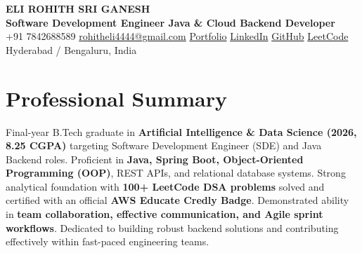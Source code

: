 \documentclass[a4paper,10pt]{article}
\begin{document}
\begin{center}
    {\LARGE\bfseries ELI ROHITH SRI GANESH}\\[2pt]
    {\textbf{\large Software Development Engineer \;\textbar\; Java \& Cloud Backend Developer}}\\[2.5pt]
    {\small
    +91 7842688589 \;\;\textbar\;\;
    \href{mailto:rohitheli4444@gmail.com}{rohitheli4444@gmail.com} \;\;\textbar\;\;
    \href{https://portfolio-bliv.onrender.com/}{Portfolio} \;\;\textbar\;\;
    \href{https://www.linkedin.com/in/rohith-eli-925754262/}{LinkedIn} \;\;\textbar\;\;
    \href{https://github.com/Rohith-04-04}{GitHub} \;\;\textbar\;\;
    \href{https://leetcode.com/u/Rohith_Eli/}{LeetCode} \;\;\textbar\;\;
    Hyderabad / Bengaluru, India
    }
\end{center}

\vspace{-5pt}

\section*{Professional Summary}
\small{
Final-year B.Tech graduate in \textbf{Artificial Intelligence \& Data Science (2026, 8.25 CGPA)} targeting Software Development Engineer (SDE) and Java Backend roles. Proficient in \textbf{Java, Spring Boot, Object-Oriented Programming (OOP)}, REST APIs, and relational database systems. Strong analytical foundation with \textbf{100+ LeetCode DSA problems} solved and certified with an official \textbf{AWS Educate Credly Badge}. Demonstrated ability in \textbf{team collaboration, effective communication, and Agile sprint workflows}. Dedicated to building robust backend solutions and contributing effectively within fast-paced engineering teams.
}

\vspace{0.5pt}

\end{document}
